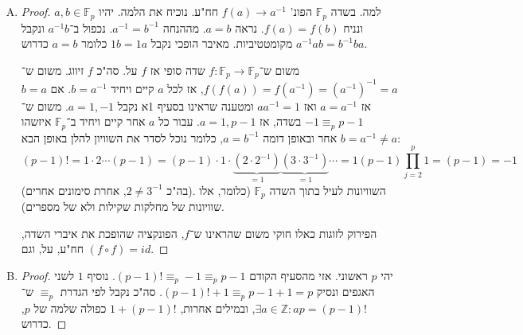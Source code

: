 \documentclass[]{article}
\newcommand\Z     {\mathbb{Z}}
\newcommand\F         {\mathbb{F}}
\newcommand\co        {\colon}
\newcommand\op    {^{-1}}
\theoremstyle{definition}
\begin{document}
	\section{}
	
	\begin{enumerate}[(A)]
		\item  \begin{proof}למה. בשדה $\F_p$ הפונ' $f(a) \to a\op$ חח"ע. נוכיח את הלמה.
			יהיו $a, b \in \F_p$ ונניח $f(a) = f(b)$. נראה $a = b$. מההנחה $a\op = b\op$. נכפול ב־$a\op b$ ונקבל $a\op a b = b\op b a$ מקומטטיביות. מאיבר הופכי נקבל $1b = 1a$ כלומר $a = b$ כדרוש. 
			
			משום ש־$f \co \F_p \to \F_p$ שדה סופי אז $f$ על. סה"כ $f$ זיווג. משום ש־$f(f(a)) = f(a\op) = (a\op)\op = a$, אז לכל $a$ קיים ויחיד $b = a\op$. אם $b = a$ אז $a = a\op$ ואז $aa\op = 1$ ומטענה שראינו בסעיף 1א נקבל $a = 1, -1$. משום ש־$-1  \equiv_p p -1$ בשדה, אז $a = 1, p - 1$. עבור כל $a$ אחר קיים ויחיד ב־$\F_p$ איזשהו $b = a\op \neq a$ אחר ובאופן דומה $a = b\op$, כלומר נוכל לסדר את השוויון להלן באופן הבא: 
			\[ (p-1)! = 1 \cdot 2 \cdots (p - 1) = (p - 1) \cdot 1 \cdot \underbrace{(2 \cdot 2\op)}_{=1}\underbrace{(3 \cdot 3\op)}_{=1} \cdots = 1(p - 1)\prod_{j = 2}^{p}1 = (p - 1) = -1 \]
			(בה"כ $2 \neq 3\op$, אחרת סימונים אחרים). השוויונות לעיל בתוך השדה $\F_p$ (כלומר, אלו שוויונות של מחלקות שקילות ולא של מספרים). 
			
			הפירוק לזוגות כאלו חוקי משום שהראינו ש־$f$, הפונקציה שהופכת את איברי השדה, חח"ע, על, וגם $(f \circ f) = id$. 
		\end{proof}
		\item \begin{proof}
			יהי $p$ ראשוני. אזי מהסעיף הקודם $(p - 1)! \equiv_p -1 \equiv_p p - 1$. נוסיף $1$ לשני האגפים ונסיק $(p - 1)! + 1 \equiv_p p - 1 + 1 = p$. סה"כ נקבל לפי הגדרת $\equiv_p$ ש־$\exists a \in \Z \co ap = (p - 1)!$, ובמילים אחרות, $1 + (p - 1)!$ כפולה שלמה של $p$, כדרוש. 
		\end{proof}
	\end{enumerate}
	
\end{document}
